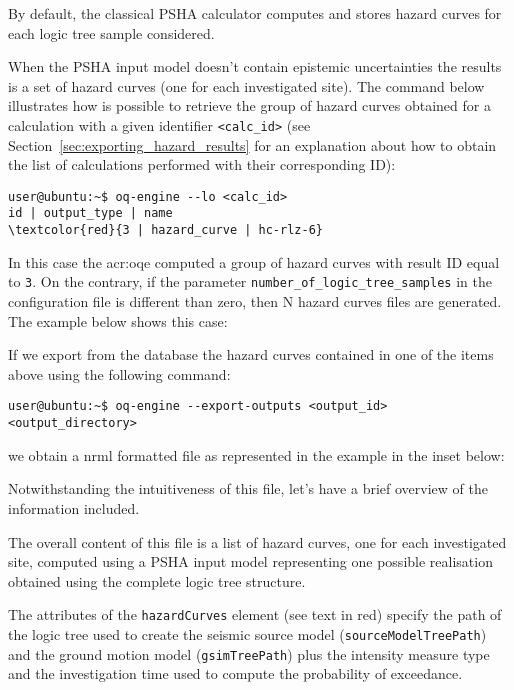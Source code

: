 By default, the classical PSHA calculator computes and stores hazard curves
for each logic tree sample considered.

When the PSHA input model doesn't contain epistemic uncertainties the results
is a set of hazard curves (one for each investigated site). The command below
illustrates how is possible to retrieve the group of hazard curves obtained
for a calculation with a given identifier \texttt{<calc\_id>} (see
Section~\ref{sec:exporting_hazard_results} for an explanation about how to
obtain the list of calculations performed with their corresponding ID):

\begin{Verbatim}[frame=single, commandchars=\\\{\}, fontsize=\small]
user@ubuntu:~$ oq-engine --lo <calc_id>
id | output_type | name
\textcolor{red}{3 | hazard_curve | hc-rlz-6}
\end{Verbatim}

In this case the \gls{acr:oqe} computed a group of hazard curves with result
ID equal to \texttt{3}. On the contrary, if the parameter
\texttt{number\_of\_logic\_tree\_samples} in the configuration file is
different than zero, then N hazard curves files are generated. The example
below shows this case:



If we export from the database the hazard curves contained in one of the
items above using the following command:

\begin{Verbatim}[frame=single, commandchars=\\\{\}, fontsize=\small]
user@ubuntu:~$ oq-engine --export-outputs <output_id> <output_directory>
\end{Verbatim}

we obtain a nrml formatted file as represented in the example in the inset
below:



Notwithstanding the intuitiveness of this file, let's have a brief
overview of the information included.

The overall content of this file is a list of hazard curves, one for each
investigated site, computed using a PSHA input model representing one possible
realisation obtained using the complete logic tree structure.

The attributes of the \texttt{hazardCurves} element (see text in red) specify
the path of the logic tree used to create the seismic source model
(\texttt{source\-Model\-TreePath}) and the ground motion model
(\texttt{gsim\-Tree\-Path}) plus the intensity measure type and the
investigation time used to compute the probability of exceedance.

